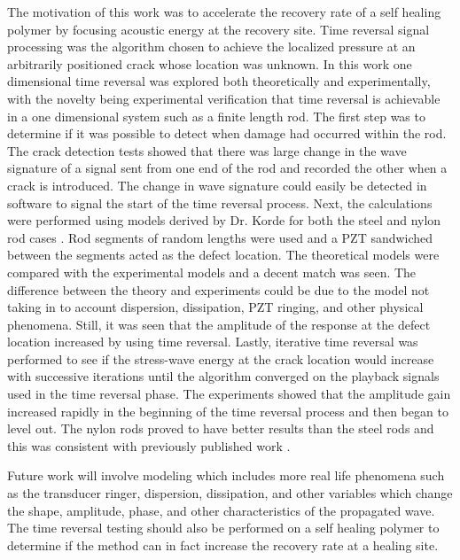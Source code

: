 
The motivation of this work was to accelerate the recovery rate of a self healing polymer by focusing acoustic energy at the recovery site. Time reversal signal processing was the algorithm chosen to achieve the localized pressure at an arbitrarily positioned crack whose location was unknown. In this work one dimensional time reversal was explored both theoretically and experimentally, with the novelty being experimental verification that time reversal is achievable in a one dimensional system such as a finite length rod. The first step was to determine if it was possible to detect when damage had occurred within the rod. The crack detection tests showed that there was large change in the wave signature of a signal sent from one end of the rod and recorded the other when a crack is introduced. The change in wave signature could easily be detected in software to signal the start of the time reversal process. Next, the calculations were performed using models derived by Dr. Korde for both the steel and nylon rod cases \cite{Fehrman2012}. Rod segments of random lengths were used and a PZT sandwiched between the segments acted as the defect location. The theoretical models were compared with the experimental models and a decent match was seen. The difference between the theory and experiments could be due to the model not taking in to account dispersion, dissipation, PZT ringing, and other physical phenomena. Still, it was seen that the amplitude of the response at the defect location increased by using time reversal. Lastly, iterative time reversal was performed to see if the stress-wave energy at the crack location would increase with successive iterations until the algorithm converged on the playback signals used in the time reversal phase. The experiments showed that the amplitude gain increased rapidly in the beginning of the time reversal process and then began to level out. The nylon rods proved to have better results than the steel rods and this was consistent with previously published work \cite{Fink1993}. 

Future work will involve modeling which includes more real life phenomena such as the transducer ringer, dispersion, dissipation, and other variables which change the shape, amplitude, phase, and other characteristics of the propagated wave. The time reversal testing should also be performed on a self healing polymer to determine if the method can in fact increase the recovery rate at a healing site.
